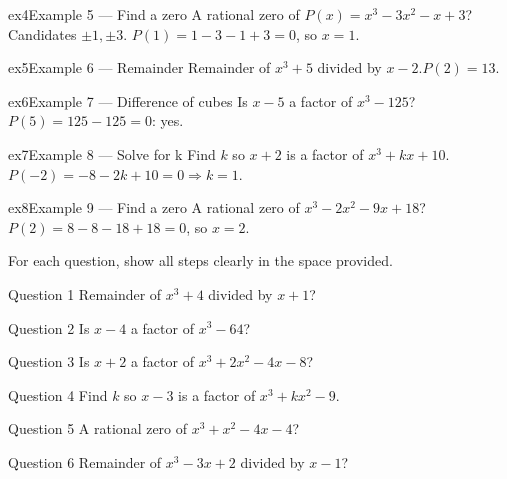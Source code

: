 \documentclass[11pt]{article}
\begin{document}
\begin{example}{ex4}{Example 5 --- Find a zero}
A rational zero of $P(x)=x^3-3x^2-x+3$?\soln Candidates $\pm1,\pm3$. $P(1)=1-3-1+3=0$, so $x=1$.
\end{example}

\begin{example}{ex5}{Example 6 --- Remainder}
Remainder of $x^3+5$ divided by $x-2$.\soln $P(2)=13$.
\end{example}

\begin{example}{ex6}{Example 7 --- Difference of cubes}
Is $x-5$ a factor of $x^3-125$?\soln $P(5)=125-125=0$: yes.
\end{example}

\begin{example}{ex7}{Example 8 --- Solve for k}
Find $k$ so $x+2$ is a factor of $x^3+kx+10$.\soln $P(-2)=-8-2k+10=0\Rightarrow k=1$.
\end{example}

\begin{example}{ex8}{Example 9 --- Find a zero}
A rational zero of $x^3-2x^2-9x+18$?\soln $P(2)=8-8-18+18=0$, so $x=2$.
\end{example}

\clearpage
{}
For each question, show all steps clearly in the space provided.

\begin{qbox}{Question 1}
Remainder of $x^3+4$ divided by $x+1$?\workspace{2.4cm}
\end{qbox}

\begin{qbox}{Question 2}
Is $x-4$ a factor of $x^3-64$?\workspace{2.4cm}
\end{qbox}

\begin{qbox}{Question 3}
Is $x+2$ a factor of $x^3+2x^2-4x-8$?\workspace{2.4cm}
\end{qbox}

\begin{qbox}{Question 4}
Find $k$ so $x-3$ is a factor of $x^3+kx^2-9$.\workspace{2.4cm}
\end{qbox}

\begin{qbox}{Question 5}
A rational zero of $x^3+x^2-4x-4$?\workspace{2.4cm}
\end{qbox}

\begin{qbox}{Question 6}
Remainder of $x^3-3x+2$ divided by $x-1$?\workspace{2.4cm}
\end{qbox}
\end{document}

